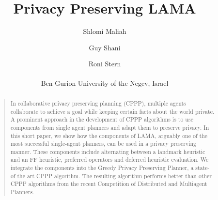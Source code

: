 \documentclass[letterpaper]{article}
\theoremstyle{definition}
\begin{document}
%
\title{Privacy Preserving LAMA}
\author{Shlomi Maliah \and Guy Shani \and Roni Stern\\\\
Ben Gurion University of the Negev, Israel\\
}
\maketitle

\begin{abstract}
\begin{quote}
In collaborative privacy preserving planning (CPPP), multiple agents collaborate to achieve a goal while keeping certain facts about the world private. A prominent approach in the development of CPPP algorithms is to use components from single agent planners and adapt them to preserve privacy. In this short paper, we show how the components of LAMA, arguably one of the most successful single-agent planners, can be used in a privacy preserving manner. These components include alternating between a landmark heuristic and an FF heuristic, preferred operators and deferred heuristic evaluation. We integrate the components into the Greedy Privacy Preserving Planner, a state-of-the-art CPPP algorithm. The resulting algorithm performs better than other CPPP algorithms from the recent Competition of Distributed and Multiagent Planners.
\end{quote}
\end{abstract}
\end{document}
